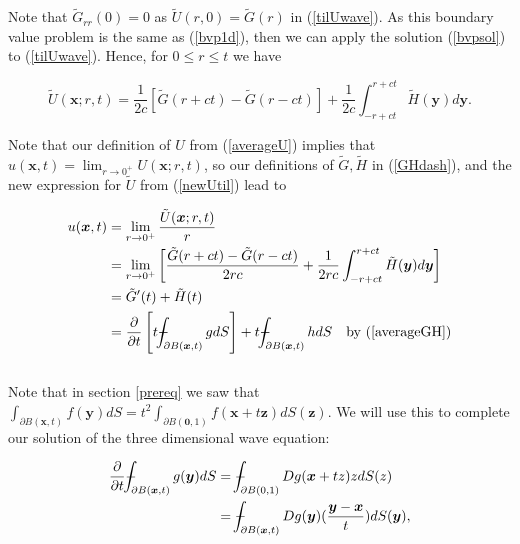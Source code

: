 \documentclass[a4paper, 12pt]{article}
\def\Xint#1{\mathchoice
{\XXint\displaystyle\textstyle{#1}}%
{\XXint\textstyle\scriptstyle{#1}}%
{\XXint\scriptstyle\scriptscriptstyle{#1}}%
{\XXint\scriptscriptstyle\scriptscriptstyle{#1}}%
\!\int}
\def\XXint#1#2#3{{\setbox0=\hbox{$#1{#2#3}{\int}$ }
\vcenter{\hbox{$#2#3$ }}\kern-.6\wd0}}
\def\dashint{\Xint-}
\numberwithin{equation}{section}
\begin{document}
Note that $\tilde{G}_{rr}(0)=0$ as $\tilde{U}(r,0)=\tilde{G}(r)$ in (\ref{tilUwave}). As this boundary value problem is the same as (\ref{bvp1d}), then we can apply 
the solution (\ref{bvpsol}) to (\ref{tilUwave}). Hence, for $0 \le r \le t$ we have 

\begin{equation} \label{newUtil}
    \tilde{U}(\boldsymbol{x};r,t)=\frac{1}{2c}\left[\tilde{G}(r+ct)-\tilde{G}(r-ct)\right]+\frac{1}{2c}\int^{r+ct}_{-r+ct}\tilde{H}(\boldsymbol{y})d\boldsymbol{y}.
\end{equation} 

Note that our definition of $U$ from (\ref{averageU}) implies that $u(\boldsymbol{x},t)=\lim_{r\rightarrow 0^+}U(\boldsymbol{x};r,t)$, so our definitions of $\tilde{G}, \tilde{H}$ in (\ref{GHdash}),
 and the new expression for $\tilde{U}$ from (\ref{newUtil}) lead to

\begin{equation} \label{almostK}
    \begin{aligned}
        u(\boldsymbol{x},t)&=\lim_{r\rightarrow 0^+}\frac{\tilde{U}(\boldsymbol{x};r,t)}{r}\\
        &=\lim_{r\rightarrow 0^+}\left[\frac{\tilde{G}(r+ct)-\tilde{G}(r-ct)}{2rc}+\frac{1}{2rc}\int^{r+ct}_{-r+ct}\tilde{H}(\boldsymbol{y})d\boldsymbol{y}\right]\\
        &=\tilde{G}'(t)+\tilde{H}(t)\\
        &=\diffp[1]{}{t}\left[t\dashint_{\partial B(\boldsymbol{x},t)}{gdS} \right]+t\dashint_{\partial B(\boldsymbol{x},t)}{hdS} \quad \textrm{by (\ref{averageGH})}
    \end{aligned}
\end{equation}
\\

Note that in section \ref{prereq} we saw that $\int_{\partial B(\boldsymbol{x},t)}f(\boldsymbol{y})dS=t^2\int_{\partial B(\boldsymbol{0},1)} f(\boldsymbol{x}+t\boldsymbol{z})dS(\boldsymbol{z})$. We will use this to complete our solution of the
three dimensional wave equation:

\begin{equation*}
    \begin{aligned}
    \diffp[1]{}{t}\dashint_{\partial B(\boldsymbol{x},t)} {g(\boldsymbol{y})dS} &= \dashint_{\partial B(0,1)} {Dg(\boldsymbol{x}+tz)zdS(z)}\\
    &=\dashint_{\partial B(\boldsymbol{x},t)}{Dg(\boldsymbol{y})(\frac{\boldsymbol{y}-\boldsymbol{x}}{t})dS(\boldsymbol{y})},
    \end{aligned}
\end{equation*}
\end{document}
